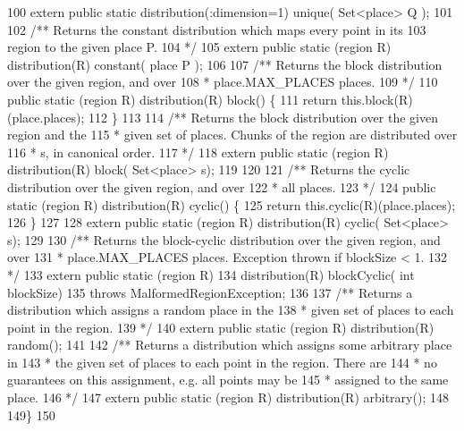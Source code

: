 \begin{tightcode}
\quad\num{100}    extern public static distribution(:dimension=1) unique( Set<place> Q );
\quad\num{101}
\quad\num{102}    /** Returns the constant distribution which maps every point in its
\quad\num{103}        region to the given place P.
\quad\num{104}    */
\quad\num{105}    extern public static (region R) distribution(R) constant( place P );
\quad\num{106}
\quad\num{107}    /** Returns the block distribution over the given region, and over
\quad\num{108}     * place.MAX\_PLACES places.
\quad\num{109}     */
\quad\num{110}    public static (region R) distribution(R) block() \{
\quad\num{111}        return this.block(R)(place.places);
\quad\num{112}    \}
\quad\num{113}
\quad\num{114}    /** Returns the block distribution over the given region and the
\quad\num{115}     * given set of places. Chunks of the region are distributed over
\quad\num{116}     * s, in canonical order.
\quad\num{117}     */
\quad\num{118}    extern public static (region R) distribution(R) block( Set<place> s);
\quad\num{119}
\quad\num{120}
\quad\num{121}    /** Returns the cyclic distribution over the given region, and over
\quad\num{122}     * all places.
\quad\num{123}     */
\quad\num{124}    public static (region R) distribution(R) cyclic() \{
\quad\num{125}        return this.cyclic(R)(place.places);
\quad\num{126}    \}
\quad\num{127}
\quad\num{128}    extern public static (region R) distribution(R) cyclic( Set<place> s);
\quad\num{129}
\quad\num{130}    /** Returns the block-cyclic distribution over the given region, and over
\quad\num{131}     * place.MAX\_PLACES places. Exception thrown if blockSize < 1.
\quad\num{132}     */
\quad\num{133}    extern public static (region R)
\quad\num{134}        distribution(R) blockCyclic( int blockSize)
\quad\num{135}        throws MalformedRegionException;
\quad\num{136}
\quad\num{137}    /** Returns a distribution which assigns a random place in the
\quad\num{138}     * given set of places to each point in the region.
\quad\num{139}     */
\quad\num{140}    extern public static (region R) distribution(R) random();
\quad\num{141}
\quad\num{142}    /** Returns a distribution which assigns some arbitrary place in
\quad\num{143}     * the given set of places to each point in the region. There are
\quad\num{144}     * no guarantees on this assignment, e.g. all points may be
\quad\num{145}     * assigned to the same place.
\quad\num{146}     */
\quad\num{147}    extern public static (region R) distribution(R) arbitrary();
\quad\num{148}
\quad\num{149}\}
\quad\num{150}
\end{tightcode}
